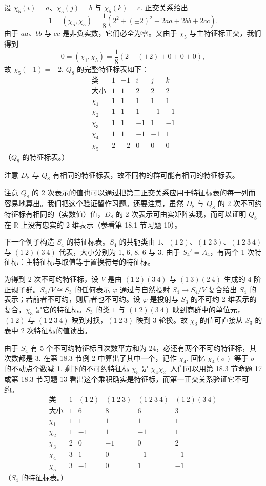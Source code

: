 设 \(\chi_5(i) = a\)、\(\chi_5(j) = b\) 与 \(\chi_5(k) = c\). 正交关系给出
\[
1 = (\chi_5, \chi_5) = \frac{1}{8}\left(2^2+(\pm2)^2+2a\bar a+2b\bar b+2c\bar c\right).
\]
由于 \(a\bar a\)、\(b\bar b\) 与 \(c\bar c\) 是非负实数，它们必全为零。又由于 \(\chi_5\) 与主特征标正交，我们得到
\[
0 = (\chi_1, \chi_5) = \frac{1}{8}\left(2+(\pm2)+0+0+0\right),
\]
故 \(\chi_5(-1) = -2\). \(Q_8\) 的完整特征标表如下：
\[
\begin{array}{c|ccccc}
\text{类} & 1 & -1 & i & j & k\\ \hline
\text{大小} & 1 & 1 & 2 & 2 & 2\\
\chi_1 & 1 & 1 & 1 & 1 & 1\\
\chi_2 & 1 & 1 & 1 & -1 & -1\\
\chi_3 & 1 & 1 & -1 & 1 & -1\\
\chi_4 & 1 & 1 & -1 & -1 & 1\\
\chi_5 & 2 & -2 & 0 & 0 & 0
\end{array}
\]
（\(Q_8\) 的特征标表。）

注意 \(D_8\) 与 \(Q_8\) 有相同的特征标表，故不同构的群可能有相同的特征标表。

注意 \(Q_8\) 的 2 次表示的值也可以通过把第二正交关系应用于特征标表的每一列而容易地算出。我们把这个验证留作习题。还要注意，虽然 \(D_8\) 与 \(Q_8\) 的 2 次不可约特征标有相同的（实数值）值，\(D_8\) 的 2 次表示可由实矩阵实现，而可以证明 \(Q_8\) 在 \(\mathbb{R}\) 上没有忠实的 2 维表示（参看第 18.1 节习题 10）。

下一个例子构造 \(S_4\) 的特征标表。\(S_4\) 的共轭类由 \(1\)、\((1\ 2)\)、\((1\ 2\ 3)\)、\((1\ 2\ 3\ 4)\) 与 \((1\ 2)(3\ 4)\) 代表，大小分别为 1, 6, 8, 6 与 3. 由于 \(S_4' = A_4\)，有两个 1 次特征标：主特征标与取值等于置换符号的特征标。

为得到 2 次不可约特征标，设 \(V\) 是由 \((1\ 2)(3\ 4)\) 与 \((1\ 3)(2\ 4)\) 生成的 4 阶正规子群。\(S_4/V \cong S_3\) 的任何表示 \(\varphi\) 通过与自然投射 \(S_4 \to S_4/V\) 复合给出 \(S_4\) 的表示；若前者不可约，则后者也不可约。设 \(\varphi\) 是投射与 \(S_3\) 的不可约 2 维表示的复合，\(\chi_3\) 是它的特征标。\(S_3\) 的类 \(1\) 与 \((1\ 2)(3\ 4)\) 映到商群中的单位元，\((1\ 2)\) 与 \((1\ 2\ 3\ 4)\) 映到对换，\((1\ 2\ 3)\) 映到 3-轮换。故 \(\chi_3\) 的值可直接从 \(S_3\) 的表中 2 次特征标的值读出。

由于 \(S_4\) 有 5 个不可约特征标且次数平方和为 24，必还有两个不可约特征标，其次数都是 3. 在第 18.3 节例 2 中算出了其中一个，记作 \(\chi_4\). 回忆 \(\chi_4(\sigma)\) 等于 \(\sigma\) 的不动点个数减 1. 剩下的不可约特征标 \(\chi_5\) 是 \(\chi_4\chi_2\). 人们可以用第 18.3 节命题 17 或第 18.3 节习题 13 看出这个乘积确实是特征标，而第一正交关系验证它不可约。
\[
\begin{array}{c|ccccc}
\text{类} & 1 & (1\ 2) & (1\ 2\ 3) & (1\ 2\ 3\ 4) & (1\ 2)(3\ 4)\\ \hline
\text{大小} & 1 & 6 & 8 & 6 & 3\\
\chi_1 & 1 & 1 & 1 & 1 & 1\\
\chi_2 & 1 & -1 & 1 & -1 & 1\\
\chi_3 & 2 & 0 & -1 & 0 & 2\\
\chi_4 & 3 & 1 & 0 & -1 & -1\\
\chi_5 & 3 & -1 & 0 & 1 & -1
\end{array}
\]
（\(S_4\) 的特征标表。）

